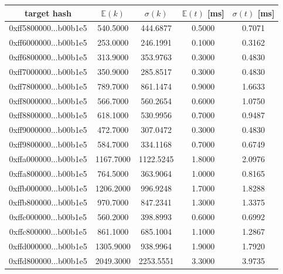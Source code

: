 \documentclass[12pt, a4paper]{article}
\begin{document}
\begin{table}[H]
    \centering
    \begin{tabular}{|c|c|c|c|c|} \hline
    target hash  & $\mathbb{E}(k)$ & $\sigma(k) $ & $\mathbb{E}(t)$ [ms] & $\sigma(t)$ [ms] \\ \hline
    0xff5800000...b00b1e5 &       540.5000 &       444.6877 &         0.5000 &        0.7071 \\ \hline
0xff6000000...b00b1e5 &       253.0000 &       246.1991 &         0.1000 &        0.3162 \\ \hline
0xff6800000...b00b1e5 &       313.9000 &       353.9763 &         0.3000 &        0.4830 \\ \hline
0xff7000000...b00b1e5 &       350.9000 &       285.8517 &         0.3000 &        0.4830 \\ \hline
0xff7800000...b00b1e5 &       789.7000 &       861.1474 &         0.9000 &        1.6633 \\ \hline
0xff8000000...b00b1e5 &       566.7000 &       560.2654 &         0.6000 &        1.0750 \\ \hline
0xff8800000...b00b1e5 &       618.1000 &       530.9956 &         0.7000 &        0.9487 \\ \hline
0xff9000000...b00b1e5 &       472.7000 &       307.0472 &         0.3000 &        0.4830 \\ \hline
0xff9800000...b00b1e5 &       584.7000 &       334.1168 &         0.7000 &        0.6749 \\ \hline
0xffa000000...b00b1e5 &      1167.7000 &      1122.5245 &         1.8000 &        2.0976 \\ \hline
0xffa800000...b00b1e5 &       764.5000 &       363.9064 &         1.0000 &        0.8165 \\ \hline
0xffb000000...b00b1e5 &      1206.2000 &       996.9248 &         1.7000 &        1.8288 \\ \hline
0xffb800000...b00b1e5 &       970.7000 &       847.2341 &         1.3000 &        1.3375 \\ \hline
0xffc000000...b00b1e5 &       560.2000 &       398.8993 &         0.6000 &        0.6992 \\ \hline
0xffc800000...b00b1e5 &       861.1000 &       685.1004 &         1.1000 &        1.2867 \\ \hline
0xffd000000...b00b1e5 &      1305.9000 &       938.9964 &         1.9000 &        1.7920 \\ \hline
0xffd800000...b00b1e5 &      2049.3000 &      2253.5551 &         3.3000 &        3.9735 \\ \hline

\end{tabular}
\end{table}
\end{document}
